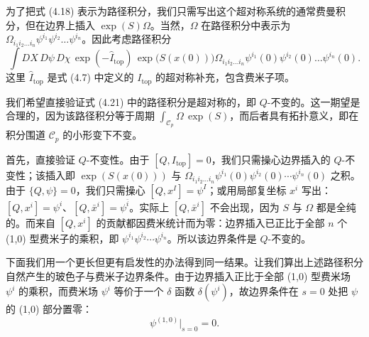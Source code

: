 \documentclass[11pt,a4paper,UTF8]{ctexart}
\theoremstyle{plain}
\theoremstyle{definition}
\begin{document}
为了把式 (4.18) 表示为路径积分，我们只需写出这个超对称系统的通常费曼积分，但在边界上插入 $\exp(S)\Omega$。当然，$\Omega$ 在路径积分中表示为 $\Omega_{i_1i_2\ldots i_n}\psi^{i_1}\psi^{i_2}\ldots\psi^{i_n}$。因此考虑路径积分
\begin{equation}
    \int DX\,D\psi\,D\chi\,\exp(-\widehat{I}_{\mathrm{top}})\,
    \exp\bigl(S(x(0))\bigr)\Omega_{i_1i_2\ldots i_n}
    \psi^{i_1}(0)\psi^{i_2}(0)\ldots\psi^{i_n}(0).
    \tag{4.21}
\end{equation}
这里 $\widehat{I}_{\mathrm{top}}$ 是式 (4.7) 中定义的 $I_{\mathrm{top}}$ 的超对称补充，包含费米子项。



我们希望直接验证式 (4.21) 中的路径积分是超对称的，即 $Q$-不变的。这一期望是合理的，因为该路径积分等于周期 $\int_{\mathcal{C}_p}\Omega\,\exp(S)$，而后者具有拓扑意义，即在积分围道 $\mathcal{C}_p$ 的小形变下不变。

首先，直接验证 $Q$-不变性。由于 $[Q,I_{\mathrm{top}}]=0$，我们只需操心边界插入的 $Q$-不变性；该插入即 $\exp(S(x(0)))$ 与 $\Omega_{i_1i_2\ldots i_n}\psi^{i_1}(0)\psi^{i_2}(0)\cdots\psi^{i_n}(0)$ 之积。由于 $\{Q,\psi\}=0$，我们只需操心 $[Q,x^I]=\psi^I$；或用局部复坐标 $x^i$ 写出：$[Q,x^i]=\psi^i$、$[Q,\bar x^i]=\psi^{\bar i}$。实际上 $[Q,\bar x^i]$ 不会出现，因为 $S$ 与 $\Omega$ 都是全纯的。而来自 $[Q,x^i]$ 的贡献都因费米统计而为零：边界插入已正比于全部 $n$ 个 (1,0) 型费米子的乘积，即 $\psi^{i_1}\psi^{i_2}\cdots\psi^{i_n}$。所以该边界条件是 $Q$-不变的。

下面我们用一个更长但更有启发性的办法得到同一结果。让我们算出上述路径积分自然产生的玻色子与费米子边界条件。由于边界插入正比于全部 (1,0) 型费米场 $\psi^i$ 的乘积，而费米场 $\psi^i$ 等价于一个 $\delta$ 函数 $\delta(\psi^i)$，故边界条件在 $s=0$ 处把 $\psi$ 的 (1,0) 部分置零：
\begin{equation}
    \psi^{(1,0)}\big|_{s=0}=0.
    \tag{4.22}
\end{equation}
\end{document}
